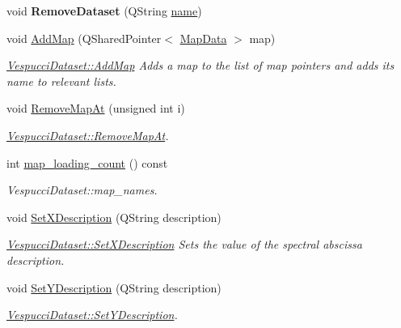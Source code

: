 \begin{DoxyCompactItemize}
\item 
void {\bfseries Remove\+Dataset} (Q\+String \hyperlink{class_vespucci_dataset_a345a51b60127316b41caf92dc88fd792}{name})\hypertarget{class_vespucci_dataset_aba2b5b8368d785374e7fb56c93403582}{}\label{class_vespucci_dataset_aba2b5b8368d785374e7fb56c93403582}

\item 
void \hyperlink{class_vespucci_dataset_a99e7818506a6a846fce631cf0d996ab0}{Add\+Map} (Q\+Shared\+Pointer$<$ \hyperlink{class_map_data}{Map\+Data} $>$ map)
\begin{DoxyCompactList}\small\item\em \hyperlink{class_vespucci_dataset_a99e7818506a6a846fce631cf0d996ab0}{Vespucci\+Dataset\+::\+Add\+Map} Adds a map to the list of map pointers and adds its name to relevant lists. \end{DoxyCompactList}\item 
void \hyperlink{class_vespucci_dataset_a4524268e2b962f0efa7569e33d5456d1}{Remove\+Map\+At} (unsigned int i)
\begin{DoxyCompactList}\small\item\em \hyperlink{class_vespucci_dataset_a4524268e2b962f0efa7569e33d5456d1}{Vespucci\+Dataset\+::\+Remove\+Map\+At}. \end{DoxyCompactList}\item 
int \hyperlink{class_vespucci_dataset_a0f4575d6d9eb3ecbb6b8de78b8fac6cb}{map\+\_\+loading\+\_\+count} () const 
\begin{DoxyCompactList}\small\item\em Vespucci\+Dataset\+::map\+\_\+names. \end{DoxyCompactList}\item 
void \hyperlink{class_vespucci_dataset_a06f001e1a7c5bc58088498c6c78555d4}{Set\+X\+Description} (Q\+String description)
\begin{DoxyCompactList}\small\item\em \hyperlink{class_vespucci_dataset_a06f001e1a7c5bc58088498c6c78555d4}{Vespucci\+Dataset\+::\+Set\+X\+Description} Sets the value of the spectral abscissa description. \end{DoxyCompactList}\item 
void \hyperlink{class_vespucci_dataset_a1665798dbd73ca4763b5101d29b7d7c3}{Set\+Y\+Description} (Q\+String description)
\begin{DoxyCompactList}\small\item\em \hyperlink{class_vespucci_dataset_a1665798dbd73ca4763b5101d29b7d7c3}{Vespucci\+Dataset\+::\+Set\+Y\+Description}. \end{DoxyCompactList}\item 

\end{DoxyCompactItemize}
